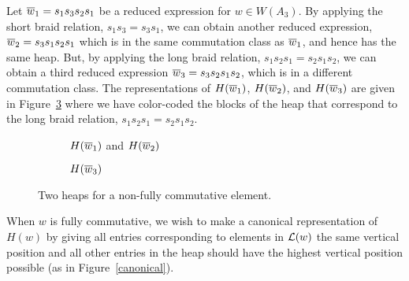 \begin{example}\label{multipleheaps}
Let $\overline{w}_1=s_1s_3s_2s_1$ be a reduced expression for $w\in W(A_3)$. By applying the short braid relation, $s_{1}s_{3}=s_{3}s_{1}$, we can obtain another reduced expression, $\overline{w}_2=s_3s_1s_2s_1$ which is in the same commutation class as $\overline{w}_1$, and hence has the same heap. But, by applying the long braid relation, $s_1s_2s_1=s_2s_1s_2$, we can obtain a third reduced expression $\overline{w}_3=s_3s_2s_1s_2$, which is in a different commutation class. The representations of $H(\overline{w}_1)$, $H(\overline{w}_2)$, and $H(\overline{w}_3)$ are given in Figure~\ref{fig:multiheap} where we have color-coded the blocks of the heap that correspond to the long braid relation, $s_1s_2s_1=s_2s_1s_2$.
\begin{figure}[h]
\centering
\begin{subfigure}[b]{0.3\textwidth}
\centering
{}
\caption{$H(\overline{w}_1)$ and $H(\overline{w}_2)$}
\label{commclass}
\end{subfigure}
\begin{subfigure}[b]{0.3\textwidth}
\centering
{}
\caption{$H(\overline{w}_3)$}
\label{commclasstwo}
\end{subfigure}
\caption{Two heaps for a non-fully commutative element.}
\label{fig:multiheap}
\end{figure}

\end{example}
When $w$ is fully commutative, we wish to make a canonical representation of $H(w)$ by giving all entries corresponding to elements in $\mathcal{L}(w)$ the same vertical position and all other entries in the heap should have the highest vertical position possible (as in Figure~\ref{canonical}).

